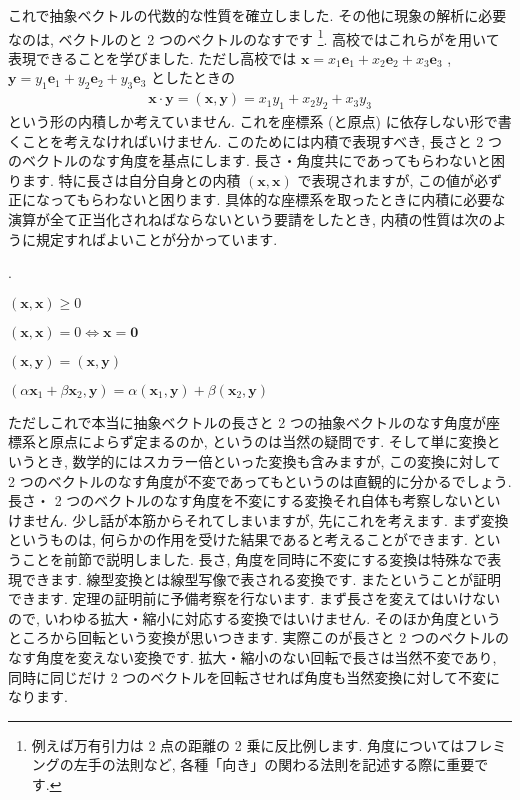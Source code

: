 \documentclass[openany, a4paper, oneside]{book}
\newcounter{enum2}
\renewenvironment{enumerate}{%
\begin{list}%
{%
\arabic{enum2}.\ \,%
}%
{%
\usecounter{enum2}
\setlength{\itemindent}{0pt}%
\setlength{\leftmargin}{6pt}%
\setlength{\rightmargin}{0pt}%
\setlength{\labelsep}{0pt}%
\setlength{\labelwidth}{6pt}%
\setlength{\itemsep}{0pt}%
\setlength{\parsep}{0pt}%
\setlength{\listparindent}{0pt}%
}
}{%
\end{list}%
}
\theoremstyle{break}
\theoremstyle{breakdefn}
\begin{document}
これで抽象ベクトルの代数的な性質を確立しました.
その他に現象の解析に必要なのは, ベクトルのと 2 つのベクトルのなすです \footnote{例えば万有引力は 2 点の距離の 2 乗に反比例します.
角度についてはフレミングの左手の法則など, 各種「向き」の関わる法則を記述する際に重要です.
 }.
高校ではこれらがを用いて表現できることを学びました.
ただし高校では
 $\bm{x} = x_1 \bm{e}_1 + x_2 \bm{e}_2 + x_3 \bm{e}_3$ ,
 $\bm{y} = y_1 \bm{e}_1 + y_2 \bm{e}_2 + y_3 \bm{e}_3$
としたときの
    \begin{align}
        \bm{x} \cdot \bm{y}
        = ( \bm{x} , \bm{y} )
        = x_1 y_1 + x_2 y_2 + x_3 y_3
    \end{align}
という形の内積しか考えていません.
これを座標系 (と原点) に依存しない形で書くことを考えなければいけません.
このためには内積で表現すべき, 長さと 2 つのベクトルのなす角度を基点にします.
長さ・角度共にであってもらわないと困ります.
特に長さは自分自身との内積 $(\bm{x},\bm{x})$ で表現されますが, この値が必ず正になってもらわないと困ります.
具体的な座標系を取ったときに内積に必要な演算が全て正当化されねばならないという要請をしたとき,
内積の性質は次のように規定すればよいことが分かっています.
    \begin{enumerate}
        \item[1)] $( \bm{x} , \bm{x} ) \geq 0$
        \item[2)] $( \bm{x} , \bm{x} ) = 0 \Longleftrightarrow \bm{x} = \bm{0}$
        \item[3)] $( \bm{x} , \bm{y} ) = ( \bm{x} , \bm{y})$
        \item[4)] $(\alpha \bm{x}_1 + \beta \bm{x}_2 , \bm{y} ) = \alpha ( \bm{x}_1 , \bm{y} ) + \beta ( \bm{x}_2 , \bm{y} )$
    \end{enumerate}
ただしこれで本当に抽象ベクトルの長さと 2 つの抽象ベクトルのなす角度が座標系と原点によらず定まるのか, というのは当然の疑問です.
そして単に変換というとき, 数学的にはスカラー倍といった変換も含みますが,
この変換に対して 2 つのベクトルのなす角度が不変であってもというのは直観的に分かるでしょう.
長さ・ 2 つのベクトルのなす角度を不変にする変換それ自体も考察しないといけません.
少し話が本筋からそれてしまいますが, 先にこれを考えます.
まず変換というものは, 何らかの作用を受けた結果であると考えることができます.
ということを前節で説明しました.
長さ, 角度を同時に不変にする変換は特殊なで表現できます.
線型変換とは線型写像で表される変換です.
またということが証明できます.
定理の証明前に予備考察を行ないます.
まず長さを変えてはいけないので, いわゆる拡大・縮小に対応する変換ではいけません.
そのほか角度というところから回転という変換が思いつきます.
実際このが長さと 2 つのベクトルのなす角度を変えない変換です.
拡大・縮小のない回転で長さは当然不変であり,
同時に同じだけ 2 つのベクトルを回転させれば角度も当然変換に対して不変になります.
\end{document}
